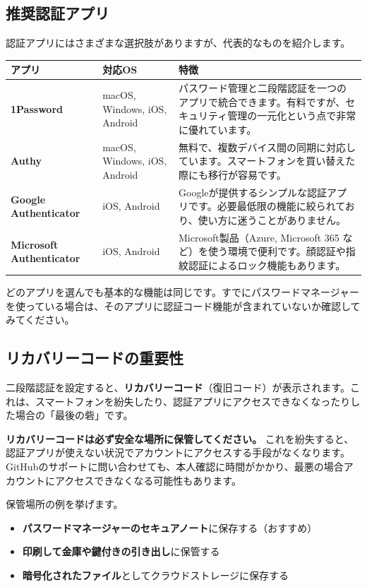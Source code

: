 \subsection{推奨認証アプリ}

認証アプリにはさまざまな選択肢がありますが、代表的なものを紹介します。

\begin{table}[htbp]
\centering
\begin{tabular}{llp{8cm}}
\hline
\textbf{アプリ} & \textbf{対応OS} & \textbf{特徴} \\
\hline
\textbf{1Password} & macOS, Windows, iOS, Android & パスワード管理と二段階認証を一つのアプリで統合できます。有料ですが、セキュリティ管理の一元化という点で非常に優れています。 \\
\textbf{Authy} & macOS, Windows, iOS, Android & 無料で、複数デバイス間の同期に対応しています。スマートフォンを買い替えた際にも移行が容易です。 \\
\textbf{Google Authenticator} & iOS, Android & Googleが提供するシンプルな認証アプリです。必要最低限の機能に絞られており、使い方に迷うことがありません。 \\
\textbf{Microsoft Authenticator} & iOS, Android & Microsoft製品（Azure, Microsoft 365 など）を使う環境で便利です。顔認証や指紋認証によるロック機能もあります。 \\
\hline
\end{tabular}
\end{table}

どのアプリを選んでも基本的な機能は同じです。すでにパスワードマネージャーを使っている場合は、そのアプリに認証コード機能が含まれていないか確認してみてください。

\subsection{リカバリーコードの重要性}

二段階認証を設定すると、\textbf{リカバリーコード}（復旧コード）が表示されます。これは、スマートフォンを紛失したり、認証アプリにアクセスできなくなったりした場合の「最後の砦」です。

\textbf{リカバリーコードは必ず安全な場所に保管してください。} これを紛失すると、認証アプリが使えない状況でアカウントにアクセスする手段がなくなります。GitHubのサポートに問い合わせても、本人確認に時間がかかり、最悪の場合アカウントにアクセスできなくなる可能性もあります。

保管場所の例を挙げます。

\begin{itemize}
  \item \textbf{パスワードマネージャーのセキュアノート}に保存する（おすすめ）
  \item \textbf{印刷して金庫や鍵付きの引き出し}に保管する
  \item \textbf{暗号化されたファイル}としてクラウドストレージに保存する
\end{itemize}

